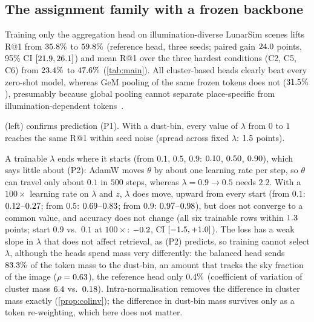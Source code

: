 

\subsection{The assignment family with a frozen backbone}\label{sec:family}\label{sec:stage1}
Training only the aggregation head on illumination-diverse LunarSim scenes lifts R@1 from
$35.8\%$ to $59.8\%$ (reference head, three seeds; paired gain $24.0$ points, 95\% CI
$[21.9,26.1]$) and mean R@1 over the three hardest conditions (C2, C5, C6) from
$23.4\%$ to $47.6\%$ (\cref{tab:main}). All cluster-based heads clearly beat every
zero-shot model, whereas GeM pooling of the same frozen tokens does not ($31.5\%$), presumably
because global pooling cannot separate place-specific from illumination-dependent
tokens~\cite{izquierdo2024optimal}.

 (left) confirms prediction (P1). With a dust-bin, every value of $\lambda$ from $0$
to $1$ reaches the same R@1 within seed noise (spread across fixed $\lambda$: $1.5$ points).

A trainable $\lambda$ ends where it starts (from $0.1$, $0.5$, $0.9$: $0.10$, $0.50$,
$0.90$), which says little about (P2): AdamW moves $\theta$ by about one learning rate per step,
so $\theta$ can travel only about $0.1$ in $500$ steps, whereas $\lambda=0.9\to0.5$ needs $2.2$. With a $100\times$ learning rate on
$\lambda$ and $z$, $\lambda$ does move, upward from every start (from $0.1$: $0.12$--$0.27$;
from $0.5$: $0.69$--$0.83$; from $0.9$: $0.97$--$0.98$),
but does not converge to a common value, and accuracy does not change (all six trainable rows within
$1.3$ points; start $0.9$ vs.\ $0.1$ at $100\times$: $-0.2$, CI
$[-1.5,+1.0]$). The loss has a weak slope in $\lambda$ that does not
affect retrieval, as (P2) predicts, so training cannot select $\lambda$, although the heads spend mass
very differently: the balanced head sends $83.3\%$ of the token mass to the
dust-bin, an amount that tracks the sky fraction of the image ($\rho=0.63$), the reference head
only $0.4\%$ (coefficient of variation of cluster mass $6.4$ vs.\ $0.18$). Intra-normalisation removes the difference in cluster mass exactly (\cref{prop:colinv}); the
difference in dust-bin mass survives only as a token re-weighting, which here does not matter.


